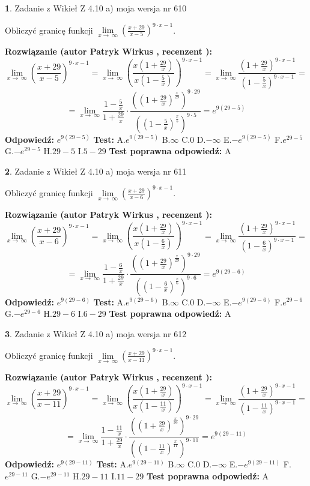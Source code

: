 \documentclass[12pt, a4paper]{article}
\theoremstyle{definition} %
\newtheorem{zad}{}
\newcommand{\zadStart}[1]{\begin{zad}#1\newline}
\newcommand{\zadStop}{\end{zad}}
\newcommand{\rozwStart}[2]{\noindent \textbf{Rozwiązanie (autor #1 , recenzent #2): }\newline}
\newcommand{\rozwStop}{\newline}
\newcommand{\odpStart}{\noindent \textbf{Odpowiedź:}\newline}
\newcommand{\odpStop}{\newline}
\newcommand{\testStart}{\noindent \textbf{Test:}\newline}
\newcommand{\testStop}{\newline}
\newcommand{\kluczStart}{\noindent \textbf{Test poprawna odpowiedź:}\newline}
\newcommand{\kluczStop}{\newline}
\begin{document}
\zadStart{Zadanie z Wikieł Z 4.10 a) moja wersja nr 610}


Obliczyć granicę funkcji  $\lim\limits_{x\to\ \infty}(\frac{x+29}{x-5})^{9\cdot x-1}$.
\zadStop
\rozwStart{Patryk Wirkus}{}
$$\lim\limits_{x\to\ \infty}(\frac{x+29}{x-5})^{9\cdot x-1} = \lim\limits_{x\to\ \infty}(\frac{x(1+\frac{29}{x})}{x(1-\frac{5}{x})})^{9\cdot x-1}=\lim\limits_{x\to\ \infty}\frac{(1+\frac{29}{x})^{9\cdot x-1}}{(1-\frac{5}{x})^{9\cdot x-1}}=$$
$$=\lim\limits_{x\to\ \infty}\frac{1-\frac{5}{x}}{1+\frac{29}{x}}\cdot\frac{((1+\frac{29}{x})^{\frac{x}{29}})^{9\cdot29}}{((1-\frac{5}{x})^{\frac{x}{5}})^{9\cdot5}}=e^{9(29-5)}$$
\rozwStop
\odpStart
$e^{9(29-5)}$
\odpStop
\testStart
A.$e^{9(29-5)}$ B.$\infty$ C.$0$ D.$-\infty$ E.$-e^{9(29-5)}$
F.$e^{29-5}$ G.$-e^{29-5}$
H.$29-5$
I.$5-29$
\testStop
\kluczStart
A
\kluczStop



\zadStart{Zadanie z Wikieł Z 4.10 a) moja wersja nr 611}


Obliczyć granicę funkcji  $\lim\limits_{x\to\ \infty}(\frac{x+29}{x-6})^{9\cdot x-1}$.
\zadStop
\rozwStart{Patryk Wirkus}{}
$$\lim\limits_{x\to\ \infty}(\frac{x+29}{x-6})^{9\cdot x-1} = \lim\limits_{x\to\ \infty}(\frac{x(1+\frac{29}{x})}{x(1-\frac{6}{x})})^{9\cdot x-1}=\lim\limits_{x\to\ \infty}\frac{(1+\frac{29}{x})^{9\cdot x-1}}{(1-\frac{6}{x})^{9\cdot x-1}}=$$
$$=\lim\limits_{x\to\ \infty}\frac{1-\frac{6}{x}}{1+\frac{29}{x}}\cdot\frac{((1+\frac{29}{x})^{\frac{x}{29}})^{9\cdot29}}{((1-\frac{6}{x})^{\frac{x}{6}})^{9\cdot6}}=e^{9(29-6)}$$
\rozwStop
\odpStart
$e^{9(29-6)}$
\odpStop
\testStart
A.$e^{9(29-6)}$ B.$\infty$ C.$0$ D.$-\infty$ E.$-e^{9(29-6)}$
F.$e^{29-6}$ G.$-e^{29-6}$
H.$29-6$
I.$6-29$
\testStop
\kluczStart
A
\kluczStop



\zadStart{Zadanie z Wikieł Z 4.10 a) moja wersja nr 612}


Obliczyć granicę funkcji  $\lim\limits_{x\to\ \infty}(\frac{x+29}{x-11})^{9\cdot x-1}$.
\zadStop
\rozwStart{Patryk Wirkus}{}
$$\lim\limits_{x\to\ \infty}(\frac{x+29}{x-11})^{9\cdot x-1} = \lim\limits_{x\to\ \infty}(\frac{x(1+\frac{29}{x})}{x(1-\frac{11}{x})})^{9\cdot x-1}=\lim\limits_{x\to\ \infty}\frac{(1+\frac{29}{x})^{9\cdot x-1}}{(1-\frac{11}{x})^{9\cdot x-1}}=$$
$$=\lim\limits_{x\to\ \infty}\frac{1-\frac{11}{x}}{1+\frac{29}{x}}\cdot\frac{((1+\frac{29}{x})^{\frac{x}{29}})^{9\cdot29}}{((1-\frac{11}{x})^{\frac{x}{11}})^{9\cdot11}}=e^{9(29-11)}$$
\rozwStop
\odpStart
$e^{9(29-11)}$
\odpStop
\testStart
A.$e^{9(29-11)}$ B.$\infty$ C.$0$ D.$-\infty$ E.$-e^{9(29-11)}$
F.$e^{29-11}$ G.$-e^{29-11}$
H.$29-11$
I.$11-29$
\testStop
\kluczStart
A
\kluczStop
\end{document}
